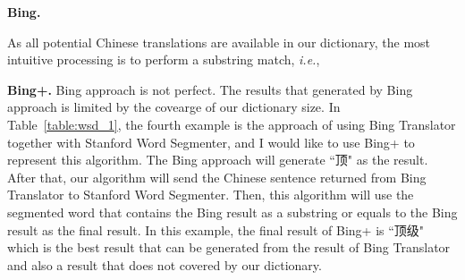 \begin{CJK}{UTF8}{gbsn}
{\bf Bing.}


As all potential Chinese translations are available in our dictionary, the most intuitive processing is to perform a substring match, {\it i.e.},



{\bf Bing+.}
Bing approach is not perfect. The results that generated by Bing approach is limited by the covearge of our dictionary size. In Table~\ref{table:wsd_1}, the fourth example is the approach of using Bing Translator together with Stanford Word Segmenter, and I would like to use Bing+ to represent this algorithm. The Bing approach will generate ``顶" as the result. After that, our algorithm will send the Chinese sentence returned from Bing Translator to Stanford Word Segmenter. Then, this algorithm will use the segmented word that contains the Bing result as a substring or equals to the Bing result as the final result. In this example, the final result of Bing+ is ``顶级" which is the best result that can be generated from the result of Bing Translator and also a result that does not covered by our dictionary.


\end{CJK}
